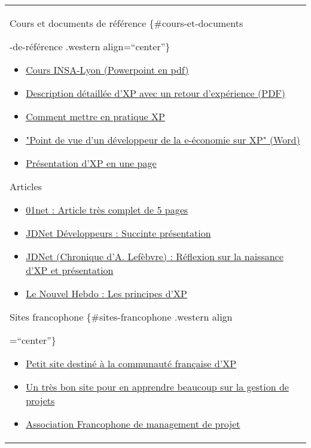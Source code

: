 \documentclass[]{article}
\begin{document}
\begin{longtable}[]{@{}l@{}}
\toprule
\endhead
\begin{minipage}[t]{0.97\columnwidth}\raggedright
\protect\hypertarget{Docs}{}{} Cours et documents de référence
\{\#cours-et-documents

-de-référence .western align=``center''\}

\begin{itemize}
\item
  \href{http://citi.insa-lyon.fr/~s\%20frenot/cours/cours01/eXtreme/eXtreme.pdf}{{Cours
  INSA-Lyon (Powerpoint en pdf)}}
\item
  \href{http://www.design-up.com/d\%20ata/presentationxp.pdf}{{Description
  détaillée d'XP avec un retour d'expérience (PDF)}}
\item
  \href{http://www.idealx.org/fr/doc/\%20xp-synthese/}{{Comment mettre
  en pratique XP}}
\item
  \href{http://www.bossavit.com/f\%20iles/ICSSEA.doc}{{"Point de vue
  d'un développeur de la e-économie sur XP" (Word)}}
\item
  \href{http://www.unil.ch/imm/docs\%20/Notes_de_cours/lang_inf/Invites/ExtremeP.pdf}{{Présentation
  d'XP en une page}}
\end{itemize}

\protect\hypertarget{Articles}{}{} Articles

\begin{itemize}
\item
  \href{http://www.01net.com/rdn?o\%20id=151118\&rub=3322\&page=end-151118}{{01net
  : Article très complet de 5 pages}}
\item
  \href{http://developpeur.\%20journaldunet.com/news/010410_extreme.shtml}{{JDNet
  Développeurs : Succinte présentation}}
\item
  \href{http://solutions.jo\%20urnaldunet.com/0105/010509_decrypt_methodes3.shtml}{{JDNet
  (Chronique d'A. Lefèbvre) : Réflexion sur la naissance d'XP et
  présentation}}
\item
  \href{http://www.netsurf.ch/arch\%20ives/2002/02_06/020603nt.html}{{Le
  Nouvel Hebdo : Les principes d'XP}}
\end{itemize}

\protect\hypertarget{Sites}{}{}Sites francophone \{\#sites-francophone
.western align

=``center''\}

\begin{itemize}
\item
  \href{http://www.xp-france.net/}{{Petit site destiné à la communauté
  française d'XP}}
\item
  \href{http://www.gestiondeproj\%20et.com/}{{Un très bon site pour en
  apprendre beaucoup sur la gestion de projets}}
\item
  \href{http://www.afitep.fr/}{{Association Francophone de management de
  projet}}
\end{itemize}


\end{minipage}
\end{longtable}
\end{document}
